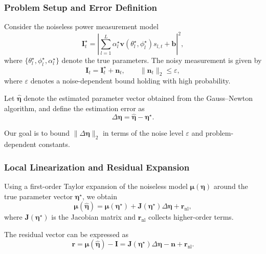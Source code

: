 \documentclass[journal]{IEEEtran}
\begin{document}
\subsubsection{Problem Setup and Error Definition}

Consider the noiseless power measurement model
\begin{equation}
\mathbf{I}_t^{\star}
=
\left|
\sum_{l=1}^{L}
\alpha_l^{\star}
\mathbf{v}(\theta_l^{\star},\phi_l^{\star})
s_{l,t}
+
\mathbf{b}
\right|^2,
\end{equation}
where $\{\theta_l^{\star},\phi_l^{\star},\alpha_l^{\star}\}$ denote the true
parameters.
The noisy measurement is given by
\begin{equation}
\mathbf{I}_t
=
\mathbf{I}_t^{\star}
+
\mathbf{n}_t,
\qquad
\|\mathbf{n}_t\|_2 \le \varepsilon,
\end{equation}
where $\varepsilon$ denotes a noise-dependent bound holding with high
probability.

Let $\hat{\boldsymbol{\eta}}$ denote the estimated parameter vector obtained
from the Gauss--Newton algorithm, and define the estimation error as
\begin{equation}
\Delta \boldsymbol{\eta}
=
\hat{\boldsymbol{\eta}}
-
\boldsymbol{\eta}^{\star}.
\end{equation}

Our goal is to bound $\|\Delta \boldsymbol{\eta}\|_2$ in terms of the noise level
$\varepsilon$ and problem-dependent constants.

\subsubsection{Local Linearization and Residual Expansion}

Using a first-order Taylor expansion of the noiseless model
$\boldsymbol{\mu}(\boldsymbol{\eta})$ around the true parameter vector
$\boldsymbol{\eta}^{\star}$, we obtain
\begin{equation}
\boldsymbol{\mu}(\hat{\boldsymbol{\eta}})
=
\boldsymbol{\mu}(\boldsymbol{\eta}^{\star})
+
\mathbf{J}(\boldsymbol{\eta}^{\star})
\Delta \boldsymbol{\eta}
+
\mathbf{r}_{\mathrm{nl}},
\label{eq:taylor_mu}
\end{equation}
where $\mathbf{J}(\boldsymbol{\eta}^{\star})$ is the Jacobian matrix and
$\mathbf{r}_{\mathrm{nl}}$ collects higher-order terms.

The residual vector can be expressed as
\begin{equation}
\mathbf{r}
=
\boldsymbol{\mu}(\hat{\boldsymbol{\eta}})
-
\mathbf{I}
=
\mathbf{J}(\boldsymbol{\eta}^{\star})
\Delta \boldsymbol{\eta}
-
\mathbf{n}
+
\mathbf{r}_{\mathrm{nl}}.
\end{equation}
\end{document}
